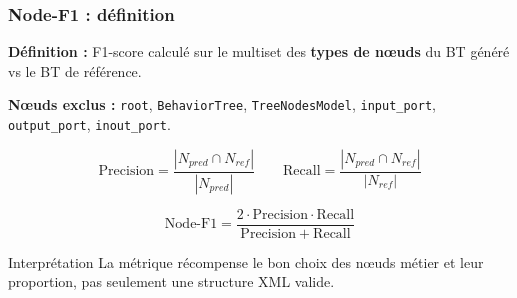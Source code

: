 \documentclass[aspectratio=169]{beamer}
\begin{document}
\begin{frame}
  \frametitle{Node-F1 : définition}

  \small
  \textbf{Définition :} F1-score calculé sur le multiset des \textbf{types de nœuds} du BT généré vs le BT de référence.

  \vspace{0.5em}
  \textbf{Nœuds exclus :} \texttt{root}, \texttt{BehaviorTree}, \texttt{TreeNodesModel}, \texttt{input\_port}, \texttt{output\_port}, \texttt{inout\_port}.

  \vspace{0.6em}
  \[
    \mathrm{Precision} = \frac{|N_{pred} \cap N_{ref}|}{|N_{pred}|}
    \qquad
    \mathrm{Recall} = \frac{|N_{pred} \cap N_{ref}|}{|N_{ref}|}
  \]

  \[
    \mathrm{Node\text{-}F1} = \frac{2 \cdot \mathrm{Precision} \cdot \mathrm{Recall}}{\mathrm{Precision} + \mathrm{Recall}}
  \]

  \vspace{0.3em}
  \begin{block}{Interprétation}
    \small
    La métrique récompense le bon choix des nœuds métier et leur proportion, pas seulement une structure XML valide.
  \end{block}
\end{frame}
\end{document}
